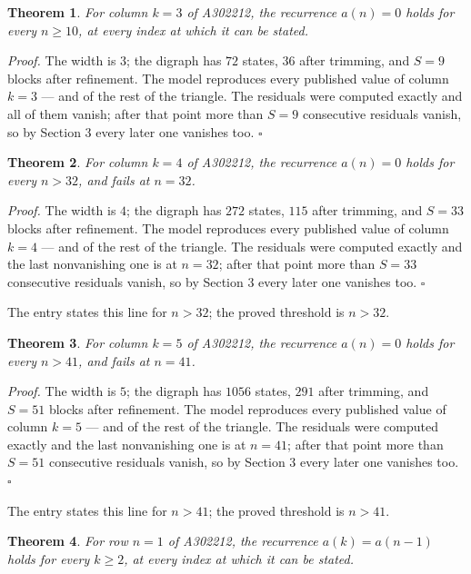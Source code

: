 \documentclass[11pt]{article}
\newtheorem{theorem}{Theorem}
\theoremstyle{definition}
\begin{document}
\begin{theorem} For column $k = 3$ of A302212, the recurrence $a(n) = 0$ holds for every $n \ge 10$, at every index at which it can be stated.\end{theorem}

{\itshape Proof.} The width is $3$; the digraph has $72$ states, $36$ after trimming, and $S = 9$ blocks after refinement. The model reproduces every published value of column $k = 3$ --- and of the rest of the triangle. The residuals were computed exactly and all of them vanish; after that point more than $S = 9$ consecutive residuals vanish, so by Section 3 every later one vanishes too. $\square$

\begin{theorem} For column $k = 4$ of A302212, the recurrence $a(n) = 0$ holds for every $n > 32$, and fails at $n = 32$.\end{theorem}

{\itshape Proof.} The width is $4$; the digraph has $272$ states, $115$ after trimming, and $S = 33$ blocks after refinement. The model reproduces every published value of column $k = 4$ --- and of the rest of the triangle. The residuals were computed exactly and the last nonvanishing one is at $n = 32$; after that point more than $S = 33$ consecutive residuals vanish, so by Section 3 every later one vanishes too. $\square$

The entry states this line for $n > 32$; the proved threshold is $n > 32$.

\begin{theorem} For column $k = 5$ of A302212, the recurrence $a(n) = 0$ holds for every $n > 41$, and fails at $n = 41$.\end{theorem}

{\itshape Proof.} The width is $5$; the digraph has $1056$ states, $291$ after trimming, and $S = 51$ blocks after refinement. The model reproduces every published value of column $k = 5$ --- and of the rest of the triangle. The residuals were computed exactly and the last nonvanishing one is at $n = 41$; after that point more than $S = 51$ consecutive residuals vanish, so by Section 3 every later one vanishes too. $\square$

The entry states this line for $n > 41$; the proved threshold is $n > 41$.

\begin{theorem} For row $n = 1$ of A302212, the recurrence $a(k) = a(n-1)$ holds for every $k \ge 2$, at every index at which it can be stated.\end{theorem}
\end{document}
